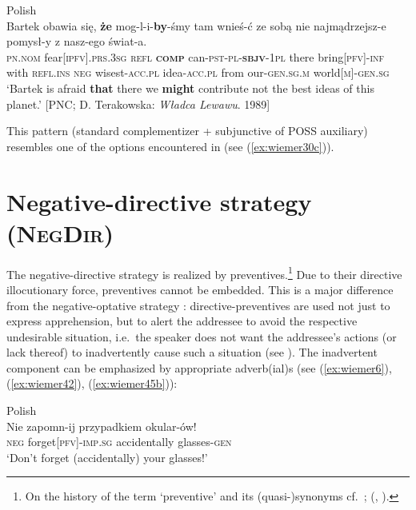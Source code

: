 \documentclass[output=paper,colorlinks,citecolor=brown]{langscibook}
\begin{document}
\ea 
\label{ex:wiemer41} 
\textnormal{Polish} \\
\gll Bartek obawia się, \textbf{że} mog-l-i-\textbf{by}-śmy tam wnieś-ć ze sobą nie najmądrzejsz-e pomysł-y z nasz-ego świat-a. \\
\textsc{pn.nom} fear\textsc{[ipfv].prs.3sg} \textsc{refl} \textbf{\textsc{comp}} can-\textsc{pst-pl-\textbf{sbjv}-1pl} there bring\textsc{[pfv]-inf} with \textsc{refl.ins} \textsc{neg} wisest-\textsc{acc.pl} idea-\textsc{acc.pl} from our-\textsc{gen.sg.m} world\textsc{[m]-gen.sg} \\
\glt `Bartek is afraid \textbf{that} there we \textbf{might} contribute not the best ideas of this planet.' {[PNC; D. Terakowska: \textit{Władca Lewawu}. 1989]}
\z


\noindent This pattern (standard complementizer + subjunctive of POSS auxiliary) resembles one of the options encountered in  (see (\ref{ex:wiemer30c})).










\section{Negative-directive strategy (\textsc{NegDir})}
\label{sec:negdir}

The negative-directive strategy is realized by preventives.\footnote{On the history of the term `preventive' and its (quasi-)synonyms cf.\ \citet[29--30]{Ivić1958}; \citeauthor{Birjulin1992} (\citeyear[2]{Birjulin1992}, \citeyear[99--100]{Birjulin1994}).} Due to their directive illocutionary force, preventives cannot be embedded. This is a major difference from the negative-optative strategy \citep[41]{Dobrushina2006wiemer}: directive-preventives are used not just to express apprehension, but to alert the addressee to avoid the respective undesirable situation, i.e.\ the speaker does not want the addressee's actions (or lack thereof) to inadvertently cause such a situation (see ). The inadvertent component can be emphasized by appropriate adverb(ial)s (see (\ref{ex:wiemer6}), (\ref{ex:wiemer42}), (\ref{ex:wiemer45b})):



\ea \textnormal{Polish} \\
\label{ex:wiemer42} 
\gll Nie zapomn-ij {\op}przypadkiem{\cp} okular-ów! \\
\textsc{neg} forget\textsc{[pfv]-imp.sg} accidentally glasses-\textsc{gen} \\
\glt `Don't forget (accidentally) your glasses!'
\z
\end{document}
